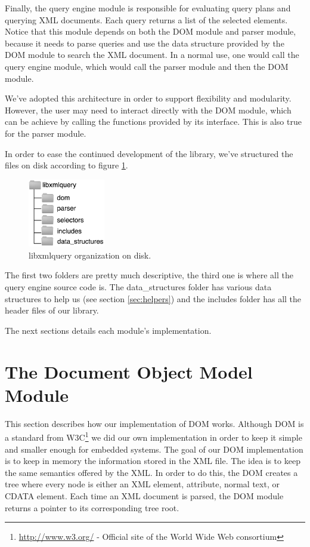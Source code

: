 \documentclass[a4paper]{report}
\begin{document}
	Finally, the query engine module is responsible for evaluating query plans and querying XML documents. Each query returns a list of the selected elements. Notice that this module depends on both the DOM module 
	and parser module, because it needs to parse queries and use the data structure provided by the DOM module to search the XML document. In a normal use, one would call the query engine module, which would call the 
	parser module and then the DOM module.
	
	We've adopted this architecture in order to support flexibility and modularity. However, the user may need to interact directly with the DOM module, which can be achieve by calling the functions provided by its interface.
	This is also true for the parser module. 
	
	In order to ease the continued development of the library, we've structured the files on disk according to figure \ref{fig:disk}.

	 \begin{figure}[h!]
		\centering
		\label{fig:disk}
		\includegraphics[width=0.30\textwidth] {disk}
		\caption{libxmlquery organization on disk.}
	 \end{figure}
	
	The first two folders are pretty much descriptive, the third one is where all the query engine source code is. The data\_structures folder has various data structures to help us (see section \ref{sec:helpers}) and the includes 
	folder has all the header files of our library.
	
	The next sections details each module's implementation.

\section{The Document Object Model Module}\label{sec:dom}
	This section describes how our implementation of DOM works. Although DOM is a standard from W3C\footnote{\url{http://www.w3.org/} - Official site of the World Wide Web consortium} we did our own implementation in 
	order to keep it simple and smaller enough for embedded systems. The goal of our DOM implementation is to keep in memory the information stored in the XML file. The idea is to keep the same semantics offered by the 
	XML. In order to do this, the DOM creates a tree where every node is either an XML element, attribute, normal text, or CDATA element. Each time an XML document is parsed, the DOM module returns a pointer to its 
	corresponding	tree root.
	
\end{document}
